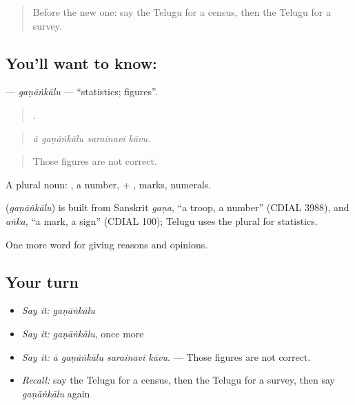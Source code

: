 \label{lesson:TE-C411-ganankalu}



\begin{quote}
Before the new one: say the Telugu for a census, then the Telugu for a survey.
\end{quote}

\subsection*{You'll want to know: }
\textbf{} — \emph{gaṇāṅkālu} — \textquotedblleft{}statistics; figures\textquotedblright{}.

\begin{quote}
   .
\end{quote}

\begin{quote}
\emph{ā gaṇāṅkālu sarainavi kāvu.}
\end{quote}

\begin{quote}
Those figures are not correct.
\end{quote}

A plural noun: , a number, + , marks, numerals.

\begin{cousinweb}
\textbf{} (\emph{gaṇāṅkālu}) is built from Sanskrit \emph{gaṇa}, \textquotedblleft{}a troop, a number\textquotedblright{} (CDIAL 3988), and \emph{aṅka}, \textquotedblleft{}a mark, a sign\textquotedblright{} (CDIAL 100); Telugu uses the plural for statistics.
\end{cousinweb}

\begin{grammarlens}[title={What you've built}]
One more word for giving reasons and opinions.
\end{grammarlens}

\subsection*{Your turn}
\begin{itemize}
\raggedright
  \item \emph{Say it:} \emph{gaṇāṅkālu}
  \item \emph{Say it:} \emph{gaṇāṅkālu}, once more
  \item \emph{Say it:} \emph{ā gaṇāṅkālu sarainavi kāvu.} — Those figures are not correct.
  \item \emph{Recall:} say the Telugu for a census, then the Telugu for a survey, then say \emph{gaṇāṅkālu} again
\end{itemize}

